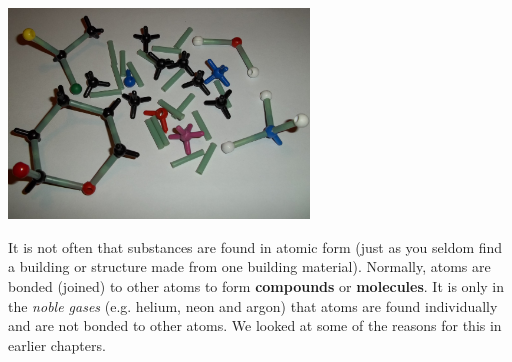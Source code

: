 \begin{minipage}{.4\textwidth}
 \begin{center}
\includegraphics[width=0.6\textwidth]{photos/atom_model_kit.jpg}
 \end{center}
\end{minipage}

      \label{m38120*id307459}It is not often that substances are found in atomic 
form (just as you seldom find a building or structure made from one building material). Normally, atoms are bonded (joined) to other atoms to form \textbf{compounds} or \textbf{molecules}. It is only in the \textsl{noble gases} (e.g. helium, neon and argon) that atoms 
are found individually and are not bonded to other atoms. We looked at some of the 
reasons for this in earlier chapters.\par 
